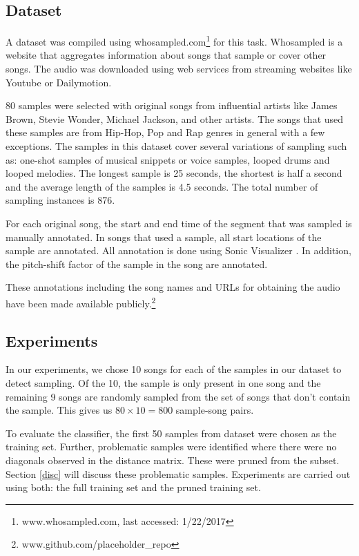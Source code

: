 \documentclass{article}
\begin{document}
\subsection{Dataset}
A dataset was compiled using whosampled.com\footnote{www.whosampled.com, last accessed: 1/22/2017} for this task. Whosampled is a website that aggregates information about songs that sample or cover other songs. The audio was downloaded using web services from streaming websites like Youtube or Dailymotion.

80 samples were selected with original songs from influential artists like James Brown, Stevie Wonder, Michael Jackson, and other artists. The songs that used these samples are from Hip-Hop, Pop and Rap genres in general with a few exceptions. The samples in this dataset cover several variations of sampling such as: one-shot samples of musical snippets or voice samples, looped drums and looped melodies. The longest sample is 25 seconds, the shortest is half a second and the average length of the samples is 4.5 seconds. The total number of sampling instances is 876.

For each original song, the start and end time of the segment that was sampled is manually annotated. In songs that used a sample, all start locations of the sample are annotated.
All annotation is done using Sonic Visualizer \cite{SonicVisualiser}. In addition, the pitch-shift factor of the sample in the song are annotated.

These annotations including the song names and URLs for obtaining the audio have been made available publicly.\footnote{www.github.com/placeholder\_repo}

\subsection{Experiments}
\label{exp}

In our experiments, we chose 10 songs for each of the samples in our dataset to detect sampling. Of the 10, the sample is only present in one song and the remaining 9 songs are randomly sampled from the set of songs that don't contain the sample. This gives us $80\times10 = 800$ sample-song pairs.

To evaluate the classifier, the first 50 samples from dataset were chosen as the training set. Further, problematic samples were identified where there were no diagonals observed in the distance matrix. These were pruned from the subset. Section \ref{disc} will discuss these problematic samples. Experiments are carried out using both: the full training set and the pruned training set.
\end{document}
